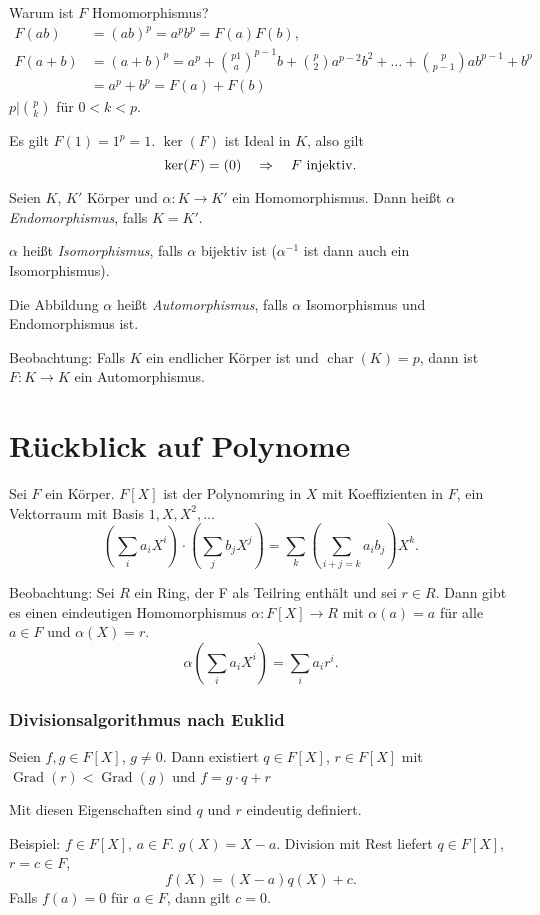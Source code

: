 \documentclass[
 a4paper,
 12pt,
 parskip=half
 ]{scrreprt}
\theoremstyle{plain}
\theoremstyle{definition}
\DeclareMathOperator{\ch}{char}
\DeclareMathOperator{\Grad}{Grad}
\numberwithin{equation}{chapter}
\numberwithin{thm}{chapter}
\begin{document}
Warum ist $F$ Homomorphismus?
\begin{align*}
  F(ab) &= (ab)^p = a^p b^p = F(a) F(b), \\
  F(a+b) &= (a+b)^p = a^p + \binom{p1} a^{p-1} b + \binom{p}{2} a^{p-2} b^2
           + \ldots + \binom{p}{p-1} ab^{p-1} + b^p \\
        &= a^p + b^p = F(a) + F(b)
\end{align*}
$p | \binom{p}{k}$ für $0 < k < p$.

Es gilt $F(1) = 1^p = 1$. $\ker(F)$ ist Ideal in $K$, also gilt
\[ \ker(F) = (0) \quad \Rightarrow \quad F \text{ injektiv}. \]

Seien $K$, $K'$ Körper und $\alpha : K \to K'$ ein Homomorphismus. Dann heißt
$\alpha$ \emph{Endomorphismus}, falls $K = K'$.

$\alpha$ heißt \emph{Isomorphismus}, falls $\alpha$ bijektiv ist ($\alpha^{-1}$
ist dann auch ein Isomorphismus).

Die Abbildung $\alpha$ heißt \emph{Automorphismus}, falls $\alpha$ Isomorphismus
und Endomorphismus ist.

Beobachtung: Falls $K$ ein endlicher Körper ist und $\ch(K) = p$, dann ist $F: K
\to K$ ein Automorphismus.

\section*{Rückblick auf Polynome}
Sei $F$ ein Körper. $F[X]$ ist der Polynomring in $X$ mit Koeffizienten in $F$,
ein Vektorraum mit Basis $1, X, X^2, \ldots$
\[ \left( \sum_i a_i X^i \right) \cdot \left( \sum_j b_j X^j \right)
  = \sum_k \left( \sum_{i+j=k} a_i b_j \right) X^k. \]

Beobachtung: Sei $R$ ein Ring, der F als Teilring enthält und sei $r \in R$.
Dann gibt es einen eindeutigen Homomorphismus $\alpha : F[X] \to R$ mit
$\alpha(a) = a$ für alle $a \in F$ und $\alpha(X) = r$.
\[ \alpha \left( \sum_i a_i X^i \right) = \sum_i a_i r^i. \]

\subsubsection*{Divisionsalgorithmus nach Euklid}
Seien $f,g \in F[X]$, $g \ne 0$. Dann existiert $q \in F[X]$, $r \in F[X]$ mit 
$\Grad(r) < \Grad(g)$ und $f = g \cdot q + r$

Mit diesen Eigenschaften sind $q$ und $r$ eindeutig definiert.
 
Beispiel: $f \in F[X]$, $a \in F$. $g(X) = X - a$. Division mit Rest liefert $q
\in F[X]$, $r = c \in F$,
\[ f(X) = (X-a) q(X) + c. \]
Falls $f(a)= 0$ für $a \in F$, dann gilt $c = 0$.
\end{document}
